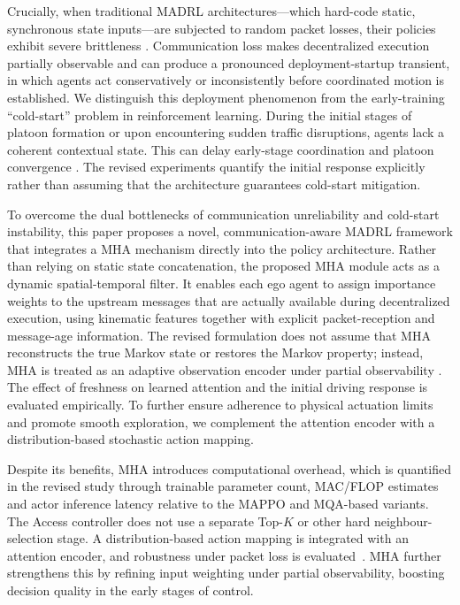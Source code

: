 \documentclass{ieeeaccess}
\begin{document}
Crucially, when traditional MADRL architectures—which hard-code static, synchronous state inputs—are subjected to random packet losses, their policies exhibit severe brittleness \cite{11016811}. Communication loss makes decentralized execution partially observable and can produce a pronounced deployment-startup transient, in which agents act conservatively or inconsistently before coordinated motion is established. We distinguish this deployment phenomenon from the early-training ``cold-start'' problem in reinforcement learning\cite{Xiao04072022,LI2025130105}. During the initial stages of platoon formation or upon encountering sudden traffic disruptions, agents lack a coherent contextual state. This can delay early-stage coordination and platoon convergence \cite{Zhang2020DeterministicPR}. The revised experiments quantify the initial response explicitly rather than assuming that the architecture guarantees cold-start mitigation.


To overcome the dual bottlenecks of communication unreliability and cold-start instability, this paper proposes a novel, communication-aware MADRL framework that integrates a MHA mechanism directly into the policy architecture. Rather than relying on static state concatenation, the proposed MHA module acts as a dynamic spatial-temporal filter. It enables each ego agent to assign importance weights to the upstream messages that are actually available during decentralized execution, using kinematic features together with explicit packet-reception and message-age information. The revised formulation does not assume that MHA reconstructs the true Markov state or restores the Markov property; instead, MHA is treated as an adaptive observation encoder under partial observability \cite{Vaswani2017}. The effect of freshness on learned attention and the initial driving response is evaluated empirically. To further ensure adherence to physical actuation limits and promote smooth exploration, we complement the attention encoder with a distribution-based stochastic action mapping.


Despite its benefits, MHA introduces computational overhead, which is quantified in the revised study through trainable parameter count, MAC/FLOP estimates and actor inference latency relative to the MAPPO and MQA-based variants. The Access controller does not use a separate Top-$K$ or other hard neighbour-selection stage. A distribution-based action mapping is integrated with an attention encoder, and robustness under packet loss is evaluated~\cite{cai2024multi}. MHA further strengthens this by refining input weighting under partial observability, boosting decision quality in the early stages of control.
\end{document}
